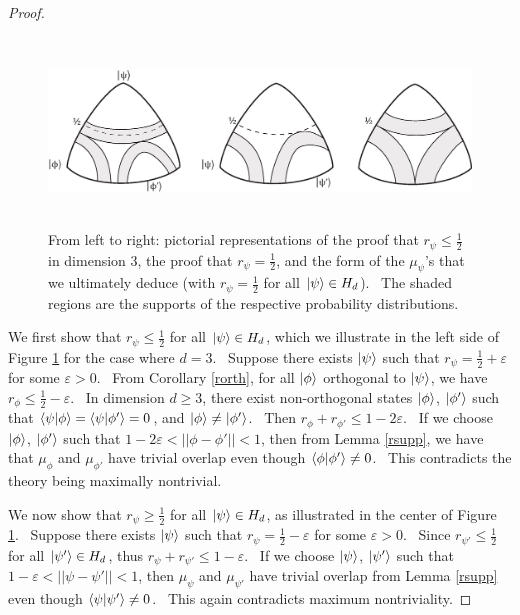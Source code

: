 \documentclass[letterpaper,12pt]{article}
\newcommand{\braket}[2]{\mbox{$ \langle #1 | #2 \rangle $}}
\newcommand{\ket}[1]{\mbox{$ | #1 \rangle $}}
\begin{document}
\begin{proof}
\begin{figure}[h] \centering
\includegraphics[height=5cm]{figlemma5}
\caption{From left to right: pictorial representations of the proof that $r_{\psi}\leq\frac{1}{2}$ in dimension $3$, the proof that $r_{\psi}=\frac{1}{2}$, and the form of the $\mu_{\psi}$'s that we ultimately deduce (with $r_{\psi}=\frac{1}{2}$ for all $\ket{\psi}\in H_d$). \ The shaded regions are the supports of the respective probability distributions.} \label{figlemma5}
\end{figure}
We first show that $r_{\psi}\leq \frac{1}{2}$ for all $\ket{\psi}\in H_d$, which we illustrate in the left side of Figure \ref{figlemma5} for the case where $d=3$. \ Suppose there exists $\ket{\psi}$ such that $r_{\psi}=\frac{1}{2}+\varepsilon$ for some $\varepsilon>0$. \ From Corollary \ref{rorth}, for all $\ket{\phi}$ orthogonal to $\ket{\psi}$, we have $r_{\phi}\leq \frac{1}{2}-\varepsilon$. \ In dimension $d\geq 3$, there exist non-orthogonal states $\ket{\phi}$, $\ket{\phi'}$ such that $\braket{\psi}{\phi}=\braket{\psi}{\phi'}=0$, and $\ket{\phi}\neq\ket{\phi'}$. \ Then $r_{\phi}+r_{\phi'}\leq 1-2\varepsilon$. \ If we choose $\ket{\phi}$, $\ket{\phi'}$ such that $1-2\varepsilon<||\phi-\phi'||<1$, then from Lemma \ref{rsupp}, we have that $\mu_{\phi}$ and $ \mu_{\phi'}$ have trivial overlap even though $\braket{\phi}{\phi'}\neq 0$. \ This contradicts the theory being maximally nontrivial.

We now show that $r_{\psi}\geq \frac{1}{2}$ for all $\ket{\psi}\in H_d$, as illustrated in the center of Figure \ref{figlemma5}. \ Suppose there exists $\ket{\psi}$ such that $r_{\psi}=\frac{1}{2}-\varepsilon$ for some $\varepsilon>0$. \ Since $r_{\psi'}\leq\frac{1}{2}$ for all $\ket{\psi'}\in H_d$, thus $r_{\psi}+r_{\psi'}\leq 1-\varepsilon$. \ If we choose $\ket{\psi}$, $\ket{\psi'}$ such that $1-\varepsilon < ||\psi-\psi'||<1$, then  $\mu_{\psi}$ and $ \mu_{\psi'}$ have trivial overlap from Lemma \ref{rsupp} even though $\braket{\psi}{\psi'}\neq 0$. \ This again contradicts maximum nontriviality.
\end{proof}
\end{document}
